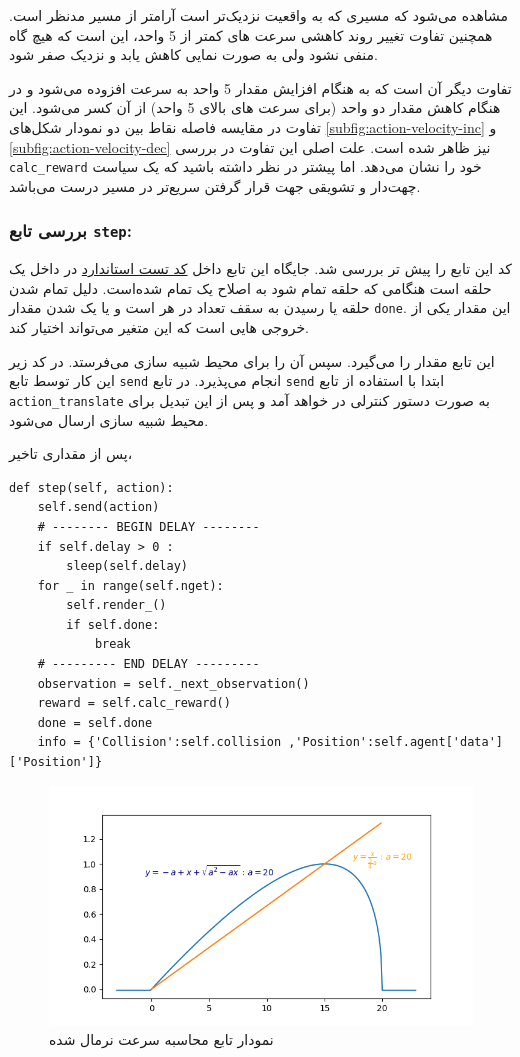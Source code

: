 مشاهده می‌شود که مسیری که به واقعیت نزدیک‌تر است آرامتر از مسیر مدنظر است. همچنین تفاوت تغییر روند کاهشی سرعت های کمتر از 5 واحد، این است که هیچ گاه منفی نشود ولی به صورت نمایی کاهش یابد و نزدیک صفر شود.

 تفاوت دیگر آن است که به هنگام افزایش مقدار 5 واحد به سرعت افزوده می‌شود و در هنگام کاهش مقدار دو واحد (برای سرعت های بالای 5 واحد) از آن کسر می‌شود. این تفاوت در مقایسه فاصله نقاط بین دو نمودار شکل‌های \ref{subfig:action-velocity-inc} و  \ref{subfig:action-velocity-dec} نیز ظاهر شده است. علت اصلی این تفاوت در بررسی \texttt{calc\_reward} خود را نشان می‌دهد. اما پیشتر در نظر داشته باشید که یک سیاست چهت‌دار و تشویقی جهت قرار گرفتن سریع‌تر در مسیر درست می‌باشد.
 
\subsubsection{بررسی تابع \textbf{\texttt{step}:}}

کد این تابع را پیش تر بررسی شد. جایگاه این تابع داخل 
\hyperref[code:standard-test]{کد تست استاندارد}
در داخل یک حلقه است هنگامی که حلقه تمام شود به اصلاح یک  تمام شده‌است. دلیل تمام شدن حلقه یا رسیدن به سقف تعداد  در هر  است و یا یک شدن مقدار \texttt{done}. این مقدار یکی از خروجی هایی است که این متغیر می‌تواند اختیار کند.
 
این تابع مقدار  را می‌گیرد. سپس آن را برای محیط شبیه سازی می‌فرستد. در کد زیر این کار توسط تابع \texttt{send} انجام می‌پذیرد. در تابع \texttt{send} ابتدا با استفاده از تابع \texttt{action\_translate} به صورت دستور کنترلی در خواهد آمد و پس از این تبدیل برای محیط شبیه سازی ارسال می‌شود.

پس از مقداری تاخیر،




\begin{latin}
\begin{lstlisting}
def step(self, action):	
	self.send(action)
	# -------- BEGIN DELAY --------
	if self.delay > 0 :
		sleep(self.delay)
	for _ in range(self.nget):
		self.render_()
		if self.done:
			break
	# --------- END DELAY -‌--------
	observation = self._next_observation()
	reward = self.calc_reward()
	done = self.done
	info = {'Collision':self.collision ,'Position':self.agent['data']['Position']}
\end{lstlisting}
\end{latin}













\begin{figure}
	\centering
	\includegraphics[width=0.7\linewidth]{Figures/code/reward-velocity}
	\caption{نمودار تابع محاسبه  سرعت نرمال شده}
	\label{fig:reward-velocity}
\end{figure}






